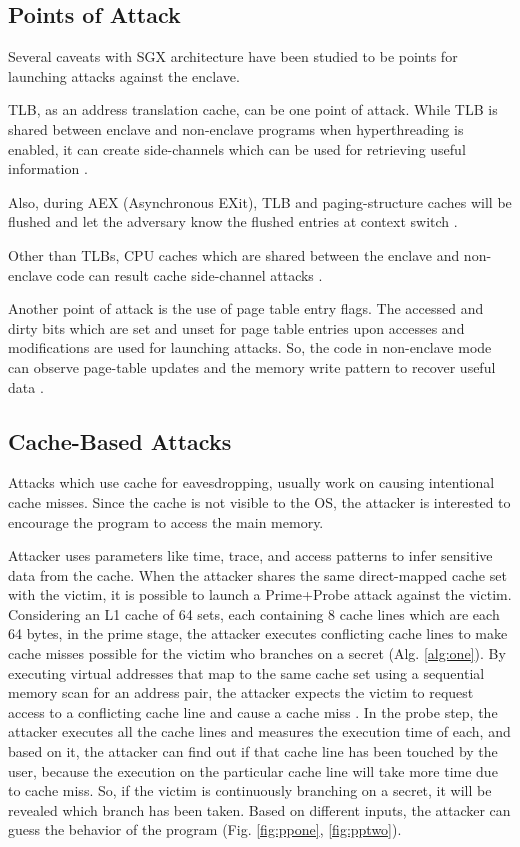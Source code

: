 \subsection{Points of Attack}
Several caveats with SGX architecture have been studied to be points for launching attacks against the enclave.

TLB, as an address translation cache, can be one point of attack. While TLB is shared between enclave and non-enclave programs when hyperthreading is enabled, it can create side-channels which can be used for retrieving useful information \cite{leakycauldron}.

Also, during AEX (Asynchronous EXit), TLB and paging-structure caches will be flushed and let the adversary know the flushed entries at context switch \cite{leakycauldron}.

Other than TLBs, CPU caches which are shared between the enclave and non-enclave code can result cache side-channel attacks \cite{leakycauldron}.

Another point of attack is the use of page table entry flags. The accessed and dirty bits which are set and unset for page table entries upon accesses and modifications are used for launching attacks. So, the code in non-enclave mode can observe page-table updates and the memory write pattern to recover useful data \cite{leakycauldron,stealthy}.

\subsection{Cache-Based Attacks}
Attacks which use cache for eavesdropping, usually work on causing intentional cache misses. Since the cache is not visible to the OS, the attacker is interested to encourage the program to access the main memory.

Attacker uses parameters like time, trace, and access patterns to infer sensitive data from the cache. When the attacker shares the same direct-mapped cache set with the victim, it is possible to launch a Prime+Probe attack against the victim. Considering an L1 cache of 64 sets, each containing 8 cache lines which are each 64 bytes, in the prime stage, the attacker executes conflicting cache lines to make cache misses possible for the victim who branches on a secret (Alg. \ref{alg:one}). By executing virtual addresses that map to the same cache set using a sequential memory scan for an address pair, the attacker expects the victim to request access to a conflicting cache line and cause a cache miss \cite{mge}. In the probe step, the attacker executes all the cache lines and measures the execution time of each, and based on it, the attacker can find out if that cache line has been touched by the user, because the execution on the particular cache line will take more time due to cache miss. So, if the victim is continuously branching on a secret, it will be revealed which branch has been taken. Based on different inputs, the attacker can guess the behavior of the program \cite{primeprobe1,primeprobe2,cloak} (Fig. \ref{fig:ppone}, \ref{fig:pptwo}).

